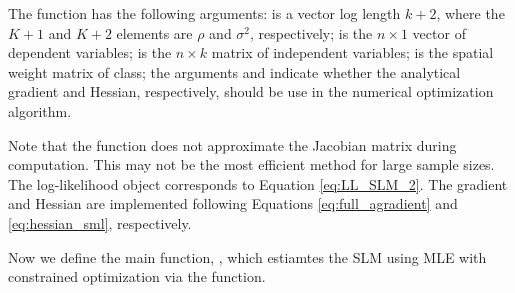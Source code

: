 \documentclass[english,12pt]{book}\usepackage[]{graphicx}\usepackage[]{xcolor}
\begin{document}
The function  has the following arguments:  is a vector log length $k + 2$, where the $K + 1$ and $K + 2$ elements are $\rho$ and $\sigma^2$, respectively;  is the $n\times 1$ vector of dependent variables;  is the $n\times k$ matrix of independent variables;  is the spatial weight matrix of  class; the arguments  and  indicate whether the analytical gradient and Hessian, respectively, should be use in the numerical optimization algorithm. 

Note that the function does not approximate the Jacobian matrix during computation. This may not be the most efficient method for large sample sizes. The log-likelihood object  corresponds to Equation \eqref{eq:LL_SLM_2}. The gradient and Hessian are implemented following Equations \eqref{eq:full_agradient} and \eqref{eq:hessian_sml}, respectively.


Now we define the main function, , which estiamtes the SLM using MLE with constrained optimization via the  function.
\end{document}
